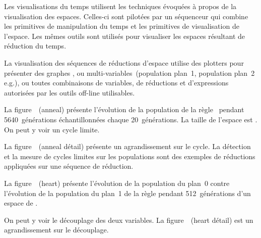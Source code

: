 Les visualisations du temps utilisent les techniques évoquées à propos
de la visualisation des espaces. %
Celles-ci sont pilotées par un séquenceur qui combine les primitives
de manipulation du temps et les primitives de visualisation de
l'espace. %
Les mêmes outils sont utilisés pour visualiser les espaces résultant
de réduction du temps. %

La visualisation des séquences de réductions d'espace utilise des
plotters pour présenter des graphes , %
ou multi-variables~(population plan~1, population plan~2 e.g.), %
ou toutes combinaisons de variables, de réductions et d'expressions
autorisées par les outils off-line utilisables. %

\noindent%
La figure~~(anneal) présente
l'évolution de la population de la règle~ pendant
5640~générations échantillonnées chaque 20~générations. %
La taille de l'espace est . %
On peut y voir un cycle limite. %

\noindent%
La figure~~(anneal détail)
présente un agrandissement sur le cycle. %
La détection et la mesure de cycles limites sur les populations sont des
exemples de réductions appliquées sur une séquence de réduction. %

\noindent%
La figure~~(heart) présente
l'évolution de la population du plan~0 contre l'évolution de la
population du plan~1 de la règle  pendant 512~générations d'un
espace de . %

\noindent%
On peut y voir le découplage des deux variables. %
La figure~~(heart détail) est un
agrandissement sur le découplage. 

\clearpage

